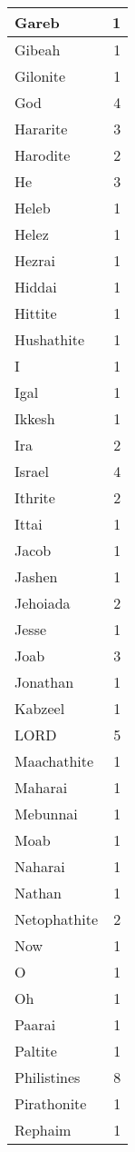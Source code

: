 \begin{center}
\begin{longtable}{l|r}
Gareb & 1 \\ \hline
Gibeah & 1 \\ \hline
Gilonite & 1 \\ \hline
God & 4 \\ \hline
Hararite & 3 \\ \hline
Harodite & 2 \\ \hline
He & 3 \\ \hline
Heleb & 1 \\ \hline
Helez & 1 \\ \hline
Hezrai & 1 \\ \hline
Hiddai & 1 \\ \hline
Hittite & 1 \\ \hline
Hushathite & 1 \\ \hline
I & 1 \\ \hline
Igal & 1 \\ \hline
Ikkesh & 1 \\ \hline
Ira & 2 \\ \hline
Israel & 4 \\ \hline
Ithrite & 2 \\ \hline
Ittai & 1 \\ \hline
Jacob & 1 \\ \hline
Jashen & 1 \\ \hline
Jehoiada & 2 \\ \hline
Jesse & 1 \\ \hline
Joab & 3 \\ \hline
Jonathan & 1 \\ \hline
Kabzeel & 1 \\ \hline
LORD & 5 \\ \hline
Maachathite & 1 \\ \hline
Maharai & 1 \\ \hline
Mebunnai & 1 \\ \hline
Moab & 1 \\ \hline
Naharai & 1 \\ \hline
Nathan & 1 \\ \hline
Netophathite & 2 \\ \hline
Now & 1 \\ \hline
O & 1 \\ \hline
Oh & 1 \\ \hline
Paarai & 1 \\ \hline
Paltite & 1 \\ \hline
Philistines & 8 \\ \hline
Pirathonite & 1 \\ \hline
Rephaim & 1 \\ \hline

\end{longtable}
\end{center}
